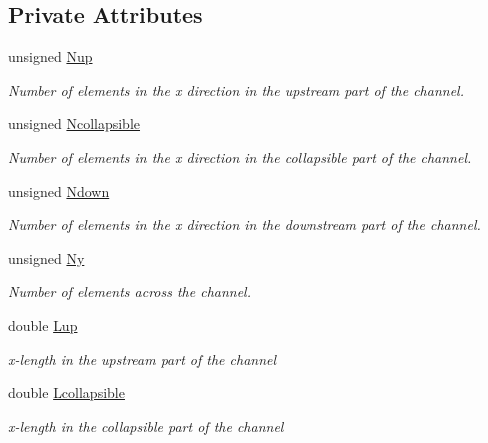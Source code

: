 \subsection*{Private Attributes}
\begin{DoxyCompactItemize}
\item 
unsigned \hyperlink{classFSICollapsibleChannelProblem_a22a5ea767bf0c437b78ed4e37b7a4818}{Nup}
\begin{DoxyCompactList}\small\item\em Number of elements in the x direction in the upstream part of the channel. \end{DoxyCompactList}\item 
unsigned \hyperlink{classFSICollapsibleChannelProblem_a3fb9656feb1c32045f4fdbd74f91258f}{Ncollapsible}
\begin{DoxyCompactList}\small\item\em Number of elements in the x direction in the collapsible part of the channel. \end{DoxyCompactList}\item 
unsigned \hyperlink{classFSICollapsibleChannelProblem_a64c0aa974b39527ef22e352a4f22b156}{Ndown}
\begin{DoxyCompactList}\small\item\em Number of elements in the x direction in the downstream part of the channel. \end{DoxyCompactList}\item 
unsigned \hyperlink{classFSICollapsibleChannelProblem_a536804b714fd0033f3028ff1c6032918}{Ny}
\begin{DoxyCompactList}\small\item\em Number of elements across the channel. \end{DoxyCompactList}\item 
double \hyperlink{classFSICollapsibleChannelProblem_a7b8288e57097875d247bda6201b1bfcf}{Lup}
\begin{DoxyCompactList}\small\item\em x-\/length in the upstream part of the channel \end{DoxyCompactList}\item 
double \hyperlink{classFSICollapsibleChannelProblem_ae6ce3834d06f0fb75db945a782ff0108}{Lcollapsible}
\begin{DoxyCompactList}\small\item\em x-\/length in the collapsible part of the channel \end{DoxyCompactList}\item 

\end{DoxyCompactItemize}
